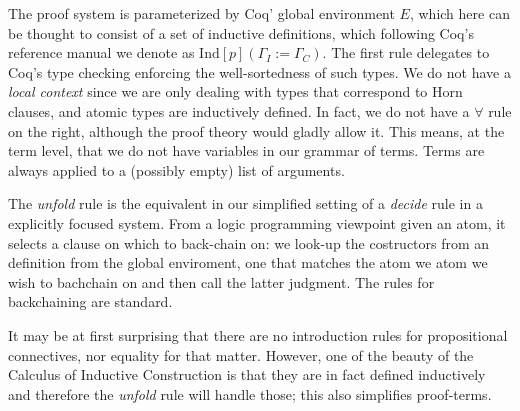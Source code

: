 The proof system is parameterized by Coq' global environment $E$, which
here can be thought to consist of a set of inductive definitions,
which following Coq's reference manual we denote as
$\mathrm{Ind}[p]  (\Gamma_I := \Gamma_C)$.  The first rule delegates
to Coq's type checking enforcing the well-sortedness of such types. We
do not have a \emph{local context} since we are only dealing with types
that correspond to Horn clauses, and atomic types are inductively
defined. In fact, we do not have a $\forall$ rule on the right,
although the proof theory would gladly allow it. This means, at the
term level, that we do not have variables in our grammar of
terms. Terms are always applied to a (possibly empty) list of
arguments.

The \emph{unfold} rule is the equivalent in our simplified setting of
a \emph{decide} rule in a explicitly focused system. From a logic
programming viewpoint given an atom, it selects a clause on which to
back-chain on: we look-up the costructors from an 
definition from the global enviroment, one that matches the atom we
atom we wish to bachchain on and then call the latter judgment. The rules for backchaining are standard.

It may be at first surprising that there are no
introduction rules for propositional connectives, nor equality for
that matter. However, one of the beauty of the Calculus of Inductive
Construction is that they are in fact defined inductively and
therefore the \emph{unfold} rule will handle those; this also
simplifies proof-terms.

%



